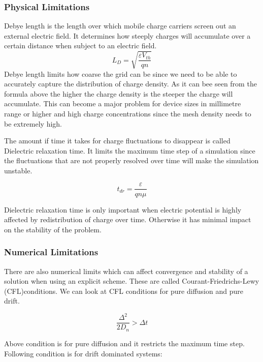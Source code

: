 \subsubsection{Physical Limitations}
Debye length is the length over which mobile charge carriers screen out an external electric field. It determines how steeply charges will accumulate over a certain distance when subject to an electric field. 
\begin{equation}
L_D=\sqrt{\frac{\varepsilon V_{th}}{q n}}
\label{debye}
\end{equation}
Debye length limits how coarse the grid can be since we need to be able to accurately capture the distribution of charge density. As it can bee seen from the formula above the higher the charge density is the steeper the charge will accumulate. This can become a major problem for device sizes in millimetre range or higher and high charge concentrations since the mesh density needs to be extremely high.

The amount if time it takes for charge fluctuations to disappear is called Dielectric relaxation time. It limits the maximum time step of a simulation since the fluctuations that are not properly resolved over time will make the simulation unstable.

\begin{equation}
t_{dr}=\frac{\varepsilon}{q n \mu}
\label{tdr}
\end{equation}

Dielectric relaxation time is only important when electric potential is highly affected by redistribution of charge over time. Otherwise it has minimal impact on the stability of the problem.
\subsubsection{Numerical Limitations}

There are also numerical limits which can affect convergence and stability of a solution when using an explicit scheme. These are called Courant-Friedrichs-Lewy (CFL)conditions. We can look at CFL conditions for pure diffusion and pure drift.

\begin{equation}
\frac{\Delta ^2}{2 D_n}>\Delta t
\label{CFL_Diff}
\end{equation}

Above condition is for pure diffusion and it restricts the maximum time step. Following condition is for drift dominated systems:

